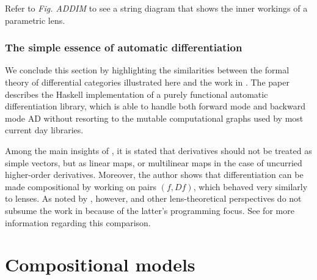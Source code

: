\documentclass[12pt,a4paper,openright,twoside]{report}
\theoremstyle{plain}
\theoremstyle{definition}
\begin{document}
Refer to \textit{Fig. ADDIM} to see a string diagram that shows the inner workings of a parametric lens.

\subsubsection{The simple essence of automatic differentiation}

We conclude this section by highlighting the similarities between the formal theory of differential categories illustrated here and the work in \cite{elliott2018simple}. The paper describes the Haskell implementation of a purely functional automatic differentiation library, which is able to handle both forward mode and backward mode AD without resorting to the mutable computational graphs used by most current day libraries. 

Among the main insights of \cite{elliott2018simple}, it is stated that derivatives should not be treated as simple vectors, but as linear maps, or multilinear maps in the case of uncurried higher-order derivatives. Moreover, the author shows that differentiation can be made compositional by working on pairs $(f, Df)$, which behaved very similarly to lenses. As noted by \cite{shiebler2021category}, however, \cite{cruttwell2022categorical} and other lens-theoretical perspectives do not subsume the work in \cite{elliott2018simple} because of the latter's programming focus. See \cite{shiebler2021category} for more information regarding this comparison.


\section{Compositional models}
\end{document}
